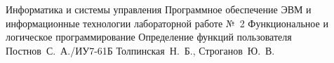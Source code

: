 \documentclass{bmstu}
\begin{document}
	\makereporttitle
	{Информатика и системы управления} %
	{Программное обеспечение ЭВМ и информационные технологии} %
	{лабораторной работе №~2} %
	{Функциональное и логическое программирование} %
	{Определение функций пользователя} %
	{} %
	{Постнов~С.~А./ИУ7-61Б} %
	{Толпинская~Н.~Б., Строганов~Ю.~В.} %
	\maketableofcontents
	
\end{document}
